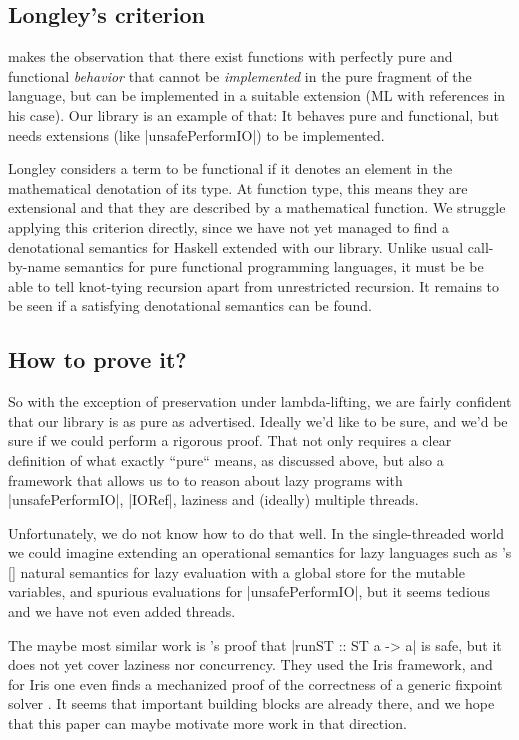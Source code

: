 \documentclass[manuscript,anonymous,screen,acmsmall]{acmart}
\begin{document}
\subsection{Longley’s criterion}

 makes the observation that there exist functions with perfectly pure and functional \emph{behavior} that cannot be \emph{implemented} in the pure fragment of the language, but can be implemented in a suitable extension (ML with references in his case). Our library is an example of that: It behaves pure and functional, but needs extensions (like |unsafePerformIO|) to be implemented.

Longley considers a term to be functional if it denotes an element in the mathematical denotation of its type. At function type, this means they are extensional and that they are described by a mathematical function. We struggle applying this criterion directly, since we have not yet managed to find a denotational semantics for Haskell extended with our library. Unlike usual call-by-name semantics for pure functional programming languages, it must be be able to tell knot-tying recursion apart from unrestricted recursion. It remains to be seen if a satisfying denotational semantics can be found.


\subsection{How to prove it?}

So with the exception of preservation under lambda-lifting, we are fairly confident that our library is as pure as advertised. Ideally we'd like to be sure, and we’d be sure if we could perform a rigorous proof.  That not only requires a clear definition of what exactly “pure“ means, as discussed above, but also a framework that allows us to to reason about lazy programs with |unsafePerformIO|, |IORef|, laziness and (ideally) multiple threads.

Unfortunately, we do not know how to do that well. In the single-threaded world we could imagine extending an operational semantics for lazy languages such as \citeauthor{launchbury}’s [\citeyear{launchbury}] natural semantics for lazy evaluation with a global store for the mutable variables, and spurious evaluations for |unsafePerformIO|, but it seems tedious and we have not even added threads.

The maybe most similar work is \citeauthor{runST}'s \citeyear{runST} proof that |runST :: ST a -> a| is safe, but it does not yet cover laziness nor concurrency.
They used the Iris framework, and for Iris one even finds a mechanized proof of the correctness of a generic fixpoint solver \citep{spygame}.
It seems that important building blocks are already there, and we hope that this paper can maybe motivate more work in that direction.
\end{document}
